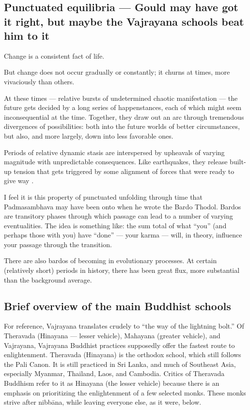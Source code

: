







\chapter{}


\section{Punctuated equilibria — Gould may have got it right,  but maybe  the Vajrayana schools beat him to it}


Change is a consistent fact of life.

But change does not occur gradually or constantly; it churns at times, more vivaciously than others.

At these times — relative bursts of undetermined chaotic manifestation — the future gets decided by a long series of happenstances, each of which might seem inconsequential at the time. Together, they draw out an arc through tremendous divergences of possibilities: both into the future worlds of better circumstances, but also, and more largely, down into less favorable ones.

Periods of relative dynamic stasis are interspersed by upheavals of varying magnitude with unpredictable consequences. Like earthquakes, they release built-up tension that gets triggered by some alignment of forces that were ready to give way \cite{bak1991self}.

I feel it is this property of punctuated unfolding through time that Padmasambhava may have been onto when he wrote the Bardo Thodol. Bardos are transitory phases through which passage can lead to a number of varying eventualities. The idea is something like: the sum total of what “you” (and perhaps those with you) have “done” — your karma — will, in theory, influence your passage through the transition.

There are also bardos of becoming in evolutionary processes. At certain (relatively short) periods in history, there has been great flux, more substantial than the background average.

\section{Brief overview of the main Buddhist schools}

For reference, Vajrayana translates crudely to “the way of the lightning bolt.” Of Theravada (Hinayana — lesser vehicle), Mahayana (greater vehicle), and Vajrayana, Vajrayana Buddhist practices supposedly offer the fastest route to enlightenment. Theravada (Hinayana) is the orthodox school, which still follows the Pali Canon. It is still practiced in Sri Lanka, and much of Southeast Asia, especially Myanmar, Thailand, Laos, and Cambodia. Critics of Theravada Buddhism refer to it as Hinayana (the lesser vehicle) because there is an emphasis on prioritizing the enlightenment of a few selected monks. These monks strive after nibbāna, while leaving everyone else, as it were, below.

